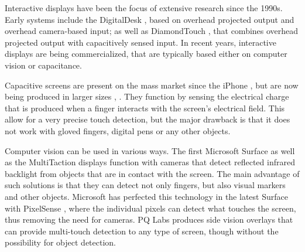 Interactive displays have been the focus of extensive research since the 1990s.
Early systems include the DigitalDesk \citep{Wellner:1993:digitaldesk}, based on overhead projected output and overhead camera-based input; as well as DiamondTouch \citep{Dietz:2001:diamondtouch}, that combines overhead projected output with capacitively sensed input.
In recent years, interactive displays are being commercialized, that are typically based either on computer vision or capacitance.

Capacitive screens are present on the mass market since the iPhone \citep{iphone}, but are now being produced in larger sizes \citep{displax}, \citep{3m}.
They function by sensing the electrical charge that is produced when a finger interacts with the screen's electrical field.
This allow for a very precise touch detection, but the major drawback is that it does not work with gloved fingers, digital pens or any other objects.

Computer vision can be used in various ways.
The first Microsoft Surface \citep{ms} as well as the MultiTaction displays \citep{multitouch} function with cameras that detect reflected infrared backlight from objects that are in contact with the screen.
The main advantage of such solutions is that they can detect not only fingers, but also visual markers and other objects.
Microsoft has perfected this technology in the latest Surface with PixelSense \citep{pixelsense}, where the individual pixels can detect what touches the screen, thus removing the need for cameras.
PQ Labs \citep{pq} produces side vision overlays that can provide multi-touch detection to any type of screen, though without the possibility for object detection.

